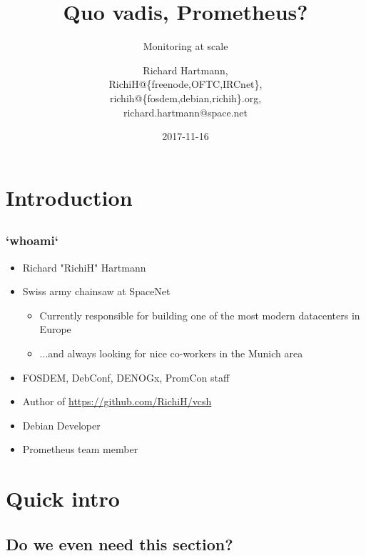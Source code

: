 \documentclass[t]{beamer}
\title{Quo vadis, Prometheus?}
\subtitle{Monitoring at scale}
\author{Richard Hartmann,\\
RichiH@\{freenode,OFTC,IRCnet\},\\
richih@\{fosdem,debian,richih\}.org,\\
richard.hartmann@space.net}
\date{2017-11-16}
\begin{document}
\setcounter{tocdepth}{1}

\section{Introduction}

\subsection{}

\begin{frame}
	\titlepage
\end{frame}


\subsection{}

\begin{frame}
	\frametitle{`whoami`}
	\begin{itemize}
		\item Richard "RichiH" Hartmann
		\item Swiss army chainsaw at SpaceNet
		\begin{itemize}
			\item Currently responsible for building one of the most modern datacenters in Europe
			\item ...and always looking for nice co-workers in the Munich area
		\end{itemize}
		\item FOSDEM, DebConf, DENOGx, PromCon staff
		\item Author of \url{https://github.com/RichiH/vcsh}
		\item Debian Developer
		\item Prometheus team member
	\end{itemize}
\end{frame}


\section{Quick intro}

\subsection{Do we even need this section?}
\end{document}
